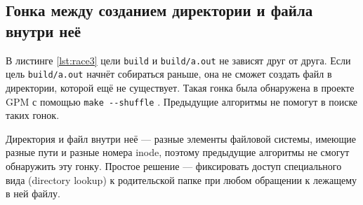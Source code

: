 \subsection{Гонка между созданием директории и файла внутри неё}



В листинге \ref{lst:race3} цели \texttt{build} и \texttt{build/a.out} не зависят друг от друга. Если цель \texttt{build/a.out} начнёт собираться раньше, она не сможет создать файл в директории, которой ещё не существует. Такая гонка была обнаружена в проекте GPM с помощью \texttt{make {-}{-}shuffle} \cite{race-3-example}. Предыдущие алгоритмы не помогут в поиске таких гонок.

Директория и файл внутри неё --- разные элементы файловой системы, имеющие разные пути и разные номера inode, поэтому предыдущие алгоритмы не смогут обнаружить эту гонку. Простое решение --- фиксировать доступ специального вида (directory lookup) к родительской папке при любом обращении к лежащему в ней файлу.






